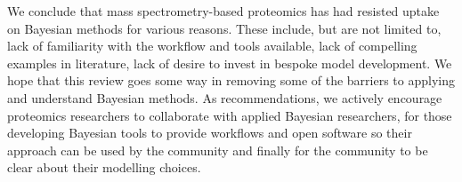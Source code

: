 \documentclass[12pt,english]{article}
\begin{document}
We conclude that mass spectrometry-based proteomics has had resisted uptake on Bayesian methods for various reasons. These include, but are not limited to, lack of familiarity with the workflow and tools available, lack of compelling examples in literature, lack of desire to invest in bespoke model development. We hope that this review goes some way in removing some of the barriers to applying and understand Bayesian methods. As recommendations, we actively encourage proteomics researchers to collaborate with applied Bayesian researchers, for those developing Bayesian tools to provide workflows and open software so their approach can be used by the community and finally for the community to be clear about their modelling choices.

	

	
\end{document}
